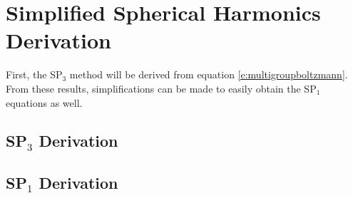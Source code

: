 \section{Simplified Spherical Harmonics Derivation}

First, the SP$_3$ method will be derived from equation \ref{e:multigroupboltzmann}.  From these results, simplifications can be made to easily obtain the SP$_1$ equations as well.

\subsection{SP$_3$ Derivation}



\subsection{SP$_1$ Derivation}